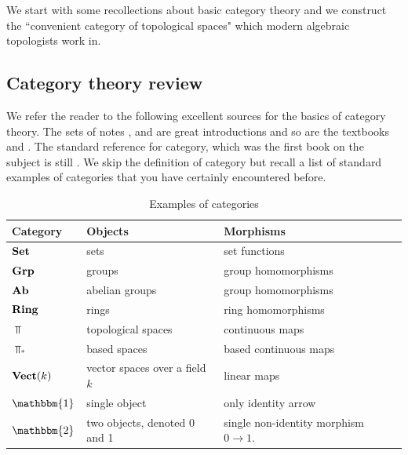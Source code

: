 \documentclass{article}[11pt]
\begin{document}
We start with some recollections about basic category theory and we construct the ``convenient category of topological spaces" which modern algebraic topologists work in.

\subsection{Category theory review}

We refer the reader to the following excellent sources for the basics of category theory. The sets of notes \cite{WOMP},\cite{Torres-cat} and \cite{mehrle} are great introductions and so are the textbooks \cite{leinster} and \cite{Riehl-context}. The standard reference for category, which was the first book on the subject is still \cite{maclane}. We skip the definition of category but recall a list of standard examples of categories that you have certainly encountered  before. 

\begin{table}[h]
    \caption{Examples of categories}
    \begin{tabular}{ p{2cm} l  p{5cm}  p{8cm} }
        \toprule
\textbf{Category}      
& \textbf{Objects}   
& \textbf{Morphisms} \\\midrule
$\textbf{Set}$ & sets & set functions \\\hline

$\textbf{Grp}$ & groups &group homomorphisms \\\hline
	 $\textbf{Ab}$ & abelian groups &group homomorphisms \\\hline
         $\textbf{Ring}$ & rings& ring homomorphisms \\\hline
	 $\Top$& topological spaces & continuous maps\\\hline
	 $\Top_\ast$ & based spaces & based continuous maps\\\hline
	 $\textbf{Vect}(k)$& vector spaces over a field $k$ & linear maps\\\hline
	 $\mathbbm{1}$ & single object & only identity arrow\\\hline
	 $\mathbbm{2}$ & two objects, denoted 0 and 1 & single non-identity morphism $0\to 1$.\\
	 \bottomrule
    \end{tabular}
\end{table}
\end{document}
